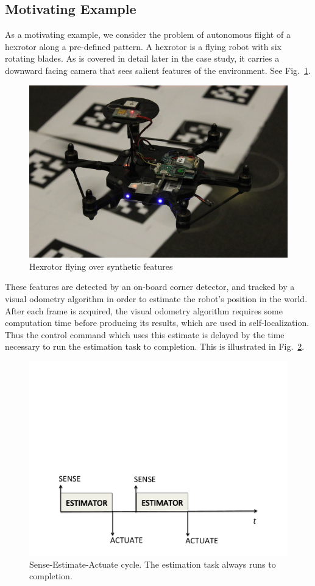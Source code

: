 \subsection{Motivating Example}
\label{motivatingExample}

As a motivating example, we consider the problem of autonomous flight of a hexrotor along a pre-defined pattern.
A hexrotor is a flying robot with six rotating blades.
As is covered in detail later in the case study, it carries a downward facing camera that sees salient features of the environment.
See Fig.~\ref{fig:hexrotor}.
\begin{figure}[htp]
	\centering
	\includegraphics[width=0.9\columnwidth]{figures/nanohex}
	\caption{Hexrotor flying over synthetic features}
	\label{fig:hexrotor}
\end{figure}
These features are detected by an on-board corner detector, and tracked by a visual odometry algorithm in order to estimate the robot's position in the world.
After each frame is acquired, the visual odometry algorithm requires some computation time before producing its results, which are used in self-localization.
Thus the control command which uses this estimate is delayed by the time necessary to run the estimation task to completion.
This is illustrated in Fig.~\ref{fig:senseActuate}.
\begin{figure}[t]
	\centering
	\includegraphics[width=0.9\columnwidth]{figures/senseActuate}
	\caption{Sense-Estimate-Actuate cycle. The estimation task always runs to completion.}
	\label{fig:senseActuate}
\end{figure}
